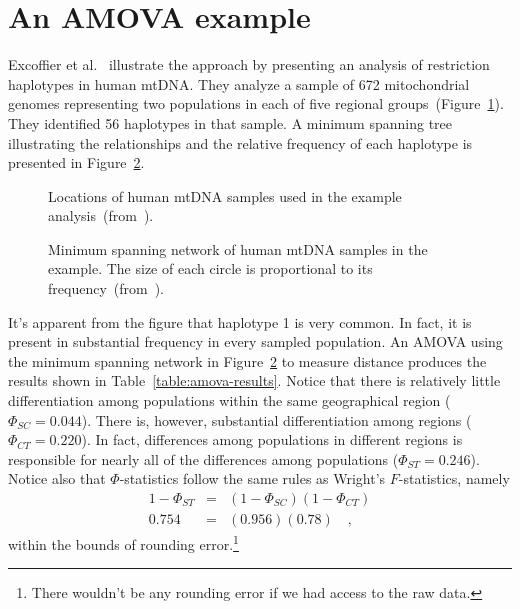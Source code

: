 \documentclass[12pt]{article}
\begin{document}
\section*{An AMOVA example}

Excoffier et al.~\cite{Excoffier-etal92} illustrate the approach by
presenting an analysis of restriction haplotypes in human mtDNA. They
analyze a sample of 672 mitochondrial genomes representing two
populations in each of five regional
groups~(Figure~\ref{fig:amova-sample-locations}). They identified 56
haplotypes in that sample. A minimum spanning tree illustrating the
relationships and the relative frequency of each haplotype is
presented in Figure~\ref{fig:amova-haplotypes}.

\begin{figure}
\caption{Locations of human mtDNA samples used in the example
  analysis~(from~\cite{Excoffier-etal92}).}\label{fig:amova-sample-locations}
\end{figure}

\begin{figure}
\begin{center}
\end{center}
\caption{Minimum spanning network of human mtDNA samples in the
  example. The size of each circle is proportional to its
  frequency~(from~\cite{Excoffier-etal92}).}\label{fig:amova-haplotypes}
\end{figure}

It's apparent from the figure that haplotype 1 is very common. In
fact, it is present in substantial frequency in every sampled
population. An AMOVA using the minimum spanning network in
Figure~\ref{fig:amova-haplotypes} to measure distance produces the
results shown in Table~\ref{table:amova-results}. Notice that there is
relatively little differentiation among populations within the same
geographical region ($\Phi_{SC} = 0.044$). There is, however,
substantial differentiation among regions ($\Phi_{CT} = 0.220$). In
fact, differences among populations in different regions is
responsible for nearly all of the differences among populations
($\Phi_{ST} = 0.246$). Notice also that $\Phi$-statistics follow the
same rules as Wright's $F$-statistics, namely
\begin{eqnarray*}
1 - \Phi_{ST} &=& (1 - \Phi_{SC})(1 - \Phi_{CT}) \\
0.754 &=& (0.956)(0.78) \quad ,
\end{eqnarray*}
within the bounds of rounding error.\footnote{There wouldn't be any
  rounding error if we had access to the raw data.}
\end{document}
